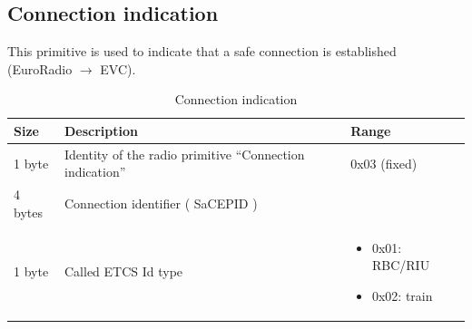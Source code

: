 \documentclass[nocc]{template/openetcs_report}
\begin{document}
\subsection{Connection indication}
This primitive is used to indicate that a safe connection is established (EuroRadio $\rightarrow$ EVC).
			\begin{longtable}{|l|l|l|}
				\caption{Connection indication}\\ 
				\hline
				
					\begin{minipage}[t]{0.1\linewidth} \textbf{Size}	\end{minipage}
				&	\begin{minipage}[t]{0.5\linewidth} \textbf{Description}	\end{minipage}
				&	\begin{minipage}[t]{0.3\linewidth} \textbf{Range} \end{minipage} \\
				
				\hline
					 \begin{minipage}[t]{0.1\linewidth}1 byte \end{minipage}
					&\begin{minipage}[t]{0.6\linewidth}Identity of the radio primitive "`Connection indication"'	\end{minipage}
					&\begin{minipage}[t]{0.3\linewidth}0x03 (fixed) \end{minipage} \\
					
				\hline
					 \begin{minipage}[t]{0.1\linewidth}4 bytes \end{minipage}
					&\begin{minipage}[t]{0.6\linewidth}Connection identifier ( SaCEPID )	\end{minipage}
					&\begin{minipage}[t]{0.3\linewidth}\end{minipage} \\
					
				\hline
					 \begin{minipage}[t]{0.1\linewidth}1 byte \end{minipage}
					&\begin{minipage}[t]{0.6\linewidth}Called ETCS Id type\end{minipage}
					&\begin{minipage}[t]{0.3\linewidth}
						\begin{itemize}
							\item 0x01: RBC/RIU
							\item 0x02: train
						\end{itemize}
					\end{minipage} \\
					

\end{longtable}
\end{document}
